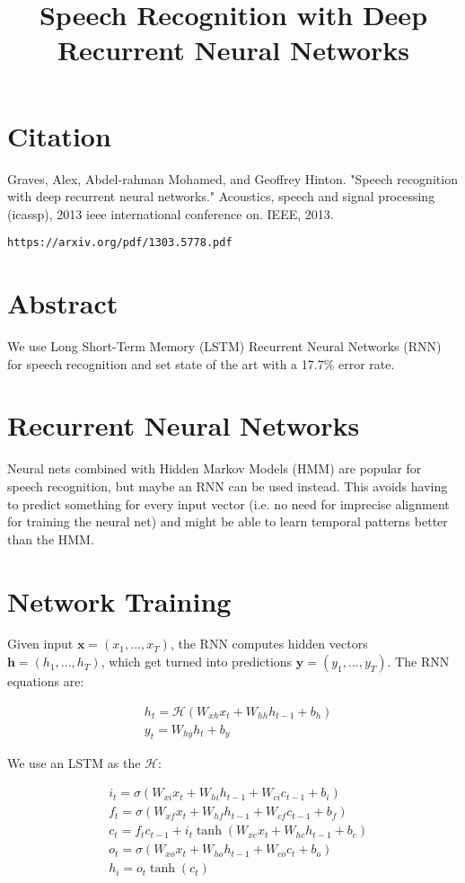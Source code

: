 \documentclass[a4paper]{article}
\title{Speech Recognition with Deep Recurrent Neural Networks}
\date{}
\begin{document}
\maketitle

\section{Citation}
Graves, Alex, Abdel-rahman Mohamed, and Geoffrey Hinton. "Speech recognition with deep recurrent neural networks." Acoustics, speech and signal processing (icassp), 2013 ieee international conference on. IEEE, 2013.

\begin{verbatim}
https://arxiv.org/pdf/1303.5778.pdf
\end{verbatim}

\section{Abstract}
We use Long Short-Term Memory (LSTM) Recurrent Neural Networks (RNN) for speech
recognition and set state of the art with a 17.7\% error rate.

\section{Recurrent Neural Networks}
Neural nets combined with Hidden Markov Models (HMM) are popular for speech
recognition, but maybe an RNN can be used instead. This avoids having to
predict something for every input vector (i.e. no need for imprecise alignment
for training the neural net) and might be able to learn temporal patterns
better than the HMM.

\section{Network Training}
Given input $\mathbf{x} = (x_1, ..., x_T)$, the RNN computes hidden
vectors $\mathbf{h} = (h_1, ..., h_T)$, which get turned into predictions
$\mathbf{y} = (y_1, ..., y_T)$. The RNN equations are:

\begin{align}
  & h_t = \mathcal{H}(W_{xh} x_t + W_{hh} h_{t-1} + b_h) \\
  & y_t = W_{hy} h_t + b_y
\end{align}

We use an LSTM as the $\mathcal{H}$:

\begin{align}
  & i_t = \sigma(W_{xi} x_t + W_{hi} h_{t-1} + W_{ci} c_{t-1} + b_i) \\
  & f_t = \sigma(W_{xf} x_t + W_{hf} h_{t-1} + W_{cf} c_{t-1} + b_f) \\
  & c_t = f_t c_{t-1} + i_t \tanh(W_{xc} x_t + W_{hc} h_{t-1} + b_c) \\
  & o_t = \sigma(W_{xo} x_t + W_{ho} h_{t-1} + W_{co} c_t + b_o) \\
  & h_i = o_t \tanh(c_t)
\end{align}
\end{document}
